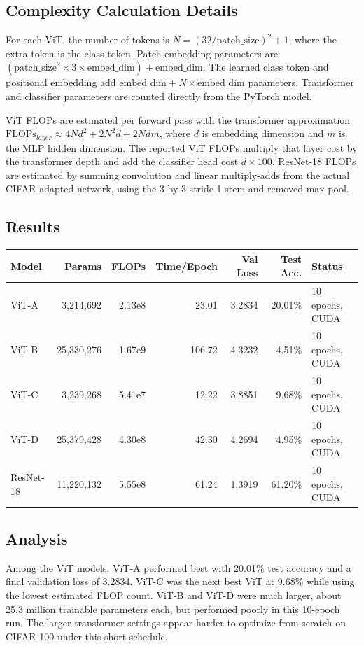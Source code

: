 \documentclass[11pt]{article}
\begin{document}
\subsection*{Complexity Calculation Details}
For each ViT, the number of tokens is $N = (32 / \mathrm{patch\_size})^2 + 1$, where the extra token is the class token. Patch embedding parameters are $(\mathrm{patch\_size}^2 \times 3 \times \mathrm{embed\_dim}) + \mathrm{embed\_dim}$. The learned class token and positional embedding add $\mathrm{embed\_dim} + N \times \mathrm{embed\_dim}$ parameters. Transformer and classifier parameters are counted directly from the PyTorch model.

ViT FLOPs are estimated per forward pass with the transformer approximation
$\mathrm{FLOPs}_{layer} \approx 4Nd^2 + 2N^2d + 2Ndm$, where $d$ is embedding dimension and $m$ is the MLP hidden dimension. The reported ViT FLOPs multiply that layer cost by the transformer depth and add the classifier head cost $d \times 100$. ResNet-18 FLOPs are estimated by summing convolution and linear multiply-adds from the actual CIFAR-adapted network, using the 3 by 3 stride-1 stem and removed max pool.

\subsection*{Results}
\begin{center}
\scriptsize
\begin{tabular}{|p{0.85in}|r|r|r|r|r|p{1.0in}|}
\hline
Model & Params & FLOPs & Time/Epoch & Val Loss & Test Acc. & Status \\
\hline
ViT-A & 3,214,692 & 2.13e8 & 23.01 & 3.2834 & 20.01\% & 10 epochs, CUDA \\
\hline
ViT-B & 25,330,276 & 1.67e9 & 106.72 & 4.3232 & 4.51\% & 10 epochs, CUDA \\
\hline
ViT-C & 3,239,268 & 5.41e7 & 12.22 & 3.8851 & 9.68\% & 10 epochs, CUDA \\
\hline
ViT-D & 25,379,428 & 4.30e8 & 42.30 & 4.2694 & 4.95\% & 10 epochs, CUDA \\
\hline
ResNet-18 & 11,220,132 & 5.55e8 & 61.24 & 1.3919 & 61.20\% & 10 epochs, CUDA \\
\hline
\end{tabular}
\end{center}

\subsection*{Analysis}
Among the ViT models, ViT-A performed best with 20.01\% test accuracy and a final validation loss of 3.2834. ViT-C was the next best ViT at 9.68\% while using the lowest estimated FLOP count. ViT-B and ViT-D were much larger, about 25.3 million trainable parameters each, but performed poorly in this 10-epoch run. The larger transformer settings appear harder to optimize from scratch on CIFAR-100 under this short schedule.
\end{document}
